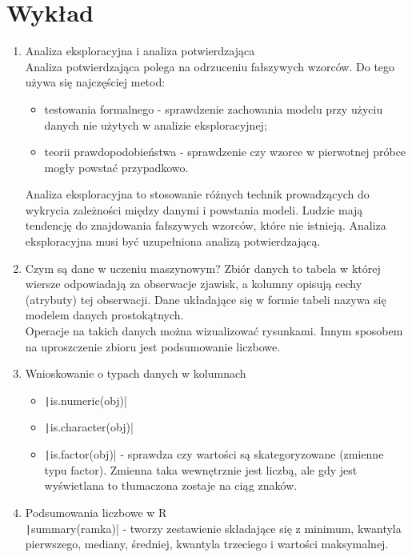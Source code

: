 \documentclass[11pt]{article}
\begin{document}
    \section{Wykład}
    \begin{enumerate}
        \item Analiza eksploracyjna i analiza potwierdzająca \\
        Analiza potwierdzająca polega na odrzuceniu fałszywych wzorców.
        Do tego używa się najczęściej metod:
        \begin{itemize}
        	\item testowania formalnego - sprawdzenie zachowania modelu przy użyciu
        	danych nie użytych w analizie eksploracyjnej;
        	\item teorii prawdopodobieństwa - sprawdzenie czy wzorce w pierwotnej próbce
        	mogły powstać przypadkowo.
        \end{itemize}
        Analiza eksploracyjna to stosowanie różnych technik prowadzących do wykrycia
        zależności między danymi i powstania modeli. Ludzie mają tendencję do
        znajdowania fałszywych wzorców, które nie istnieją. Analiza eksploracyjna
        musi być uzupełniona analizą potwierdzającą.
        
        \item Czym są dane w uczeniu maszynowym?
        Zbiór danych to tabela w której wiersze odpowiadają za obserwacje zjawisk,
        a kolumny opisują cechy (atrybuty) tej obserwacji. Dane układające się
        w formie tabeli nazywa się modelem danych prostokątnych. \\
        Operacje na takich danych można wizualizować rysunkami. Innym sposobem
        na uproszczenie zbioru jest podsumowanie liczbowe.
        
        \item Wnioskowanie o typach danych w kolumnach
        \begin{itemize}
        	\item \texttt|is.numeric(obj)|
        	\item \texttt|is.character(obj)|
        	\item \texttt|is.factor(obj)| - sprawdza czy wartości są skategoryzowane (zmienne typu factor). Zmienna taka wewnętrznie jest liczbą,
        	ale gdy jest wyświetlana to tłumaczona zostaje na ciąg znaków.
        \end{itemize}
        
        \item Podsumowania liczbowe w R \\
        \texttt|summary(ramka)| - tworzy zestawienie składające się z minimum,
        kwantyla pierwszego, mediany, średniej, kwantyla trzeciego i wartości maksymalnej.
        

\end{enumerate}
\end{document}
